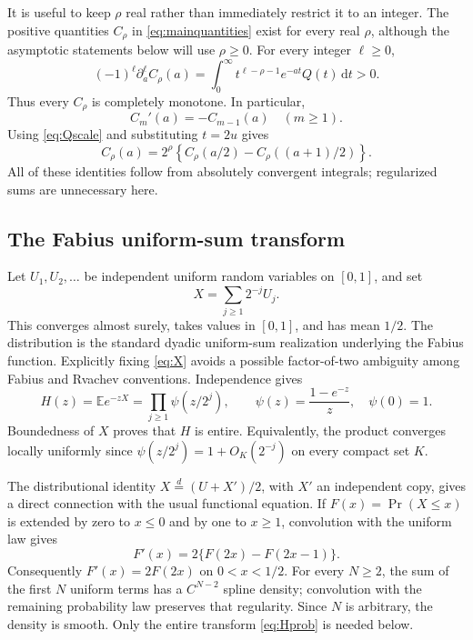 \documentclass[11pt,letterpaper]{article}
\numberwithin{equation}{section}
\theoremstyle{definition}
\theoremstyle{remark}
\newcommand{\E}{\mathbb E}
\newcommand{\dd}{\,\mathrm d}
\begin{document}
It is useful to keep $\rho$ real rather than immediately restrict it to an
integer. The positive quantities $C_\rho$ in
\eqref{eq:mainquantities} exist for every real $\rho$, although the
asymptotic statements below will use $\rho\ge0$.
For every integer $\ell\ge0$,
\begin{equation}\label{eq:cmderivatives}
 (-1)^\ell\partial_a^\ell C_\rho(a)
  =\int_0^\infty t^{\ell-\rho-1}e^{-at}Q(t)\dd t>0.
\end{equation}
Thus every $C_\rho$ is completely monotone. In particular,
\begin{equation}\label{eq:ladder}
 C_m'(a)=-C_{m-1}(a)\quad(m\ge1).
\end{equation}
Using \eqref{eq:Qscale} and substituting $t=2u$ gives
\begin{equation}\label{eq:Crhodyadic}
 C_\rho(a)=2^\rho\left\{C_\rho(a/2)-C_\rho((a+1)/2)\right\}.
\end{equation}
All of these identities follow from absolutely convergent integrals;
regularized sums are unnecessary here.

\subsection{The Fabius uniform-sum transform}
Let $U_1,U_2,\ldots$ be independent uniform random variables on $[0,1]$, and
set
\begin{equation}\label{eq:X}
 X=\sum_{j\ge1}2^{-j}U_j.
\end{equation}
This converges almost surely, takes values in $[0,1]$, and has mean $1/2$.
The distribution is the standard dyadic uniform-sum realization underlying
the Fabius function. Explicitly fixing \eqref{eq:X} avoids a possible
factor-of-two ambiguity among Fabius and Rvachev conventions.
Independence gives
\begin{equation}\label{eq:Hprob}
 H(z)=\E e^{-zX}
     =\prod_{j\ge1}\psi(z/2^j),
 \qquad \psi(z)=\frac{1-e^{-z}}z,\quad\psi(0)=1.
\end{equation}
Boundedness of $X$ proves that $H$ is entire. Equivalently, the product
converges locally uniformly since $\psi(z/2^j)=1+O_K(2^{-j})$ on every
compact set $K$.

The distributional identity $X\overset d=(U+X')/2$, with $X'$ an independent
copy, gives a direct connection with the usual functional equation.
If $F(x)=\Pr(X\le x)$ is extended by zero to $x\le0$ and by one to
$x\ge1$, convolution with the uniform law gives
\[
 F'(x)=2\{F(2x)-F(2x-1)\}.
\]
Consequently $F'(x)=2F(2x)$ on $0<x<1/2$.
For every $N\ge2$, the sum of the first $N$ uniform terms has a
$C^{N-2}$ spline density; convolution with the remaining probability law
preserves that regularity. Since $N$ is arbitrary, the density is smooth.
Only the entire transform \eqref{eq:Hprob} is needed below.
\end{document}
